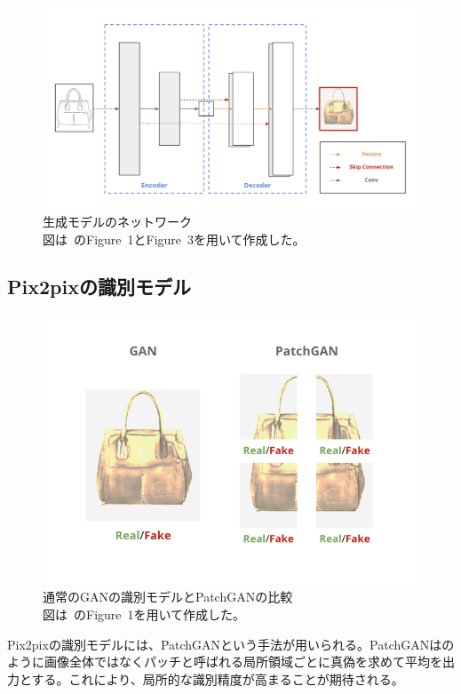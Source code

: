 \begin{figure}[t]
\centering
\includegraphics[width=0.8\columnwidth]{figure/u-net.png}
\caption[Pix2pixの生成モデル]{生成モデルのネットワーク\\
図は~\cite{pix2pix}のFigure~1とFigure~3を用いて作成した。}
\label{fig:u-net}
\end{figure}

\subsection{Pix2pixの識別モデル}

\begin{figure}[b]
\centering
\includegraphics[width=0.6\columnwidth]{figure/patchgan.png}
\caption[通常のGANの識別モデルとPatchGANの比較]{通常のGANの識別モデルとPatchGANの比較\\
図は~\cite{pix2pix}のFigure~1を用いて作成した。}
\label{fig:patchgan}
\end{figure}

Pix2pixの識別モデルには、PatchGANという手法が用いられる。PatchGANはのように画像全体ではなくパッチと呼ばれる局所領域ごとに真偽を求めて平均を出力とする。これにより、局所的な識別精度が高まることが期待される。